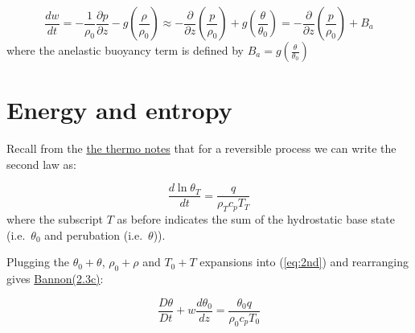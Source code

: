 \documentclass[12pt]{article}
\begin{document}
\begin{equation}
  \label{eq:anelvert}
\frac{dw }{dt}  =   - \frac{1 }{\rho_0} \frac{ \partial p }{\partial z}  - g\left ( \frac{ \rho }{\rho_0} \right )
\approx -\frac{\partial  }{ \partial z} \left ( \frac{ p}{\rho_0} \right )
+ g \left ( \frac{ \theta}{\theta_0} \right )
=  -\frac{\partial  }{ \partial z} \left ( \frac{ p}{\rho_0} \right )
+ B_a
\end{equation}
where the anelastic buoyancy term is defined by
$B_a=g \left ( \frac{ \theta}{\theta_0} \right )$

\section{Energy and entropy}
\label{sec:energy-entropy}

Recall from the \href{https://www.dropbox.com/scl/fi/zuk9evzf47qdsxi9tvgx7/thermo.pdf?rlkey=hbz3bpt6gxv5ly8rg1njfj9e4&dl=0}{the thermo notes} that for a reversible process we can write the
second law as:

\begin{equation}
  \label{eq:2nd}
  \frac{d \ln \theta_T }{dt} = \frac{q }{\rho_T c_p T_T} 
\end{equation}
where the subscript $T$ as before indicates the sum of the
hydrostatic base state (i.e.~$\theta_0$  and perubation (i.e.~$\theta$)).

Plugging the $\theta_0 + \theta$, $\rho_0 + \rho$ and $T_0 + T$ 
expansions into (\ref{eq:2nd}) and rearranging gives 
\href{https://www.dropbox.com/scl/fi/ugg14cvujp9m5b99c2vbf/bannon95a.pdf?rlkey=d8v4qvqpncduunwqpb1wdgtz1&dl=0}{Bannon(2.3c)}:

\begin{equation}
  \label{eq:bannon2nd}
  \frac{D \theta }{Dt}  + w \frac{ d \theta_0}{dz}  = \frac{\theta_0 q}{\rho_0 c_p T_0} 
\end{equation}
\end{document}
